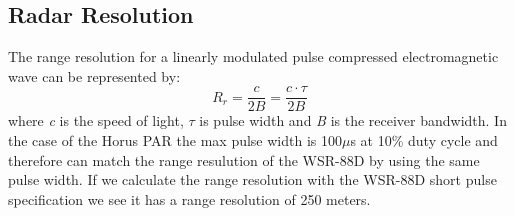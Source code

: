 \documentclass[conference]{IEEEtran}
\begin{document}
\subsection{Radar Resolution}
\par The range resolution for a linearly modulated pulse compressed electromagnetic wave can be represented by:
\begin{equation}
    R_r = \frac{c}{2B} = \frac{c\cdot\tau}{2B}
\end{equation}
where \emph{c} is the speed of light, \emph{$\tau$} is pulse width and \emph{B} is the receiver bandwidth. In the case of the Horus PAR the max pulse width is 100$\mu$s at 10\% duty cycle and therefore can match the range resulution of the WSR-88D by using the same pulse width. If we calculate the range resolution with the WSR-88D short pulse specification we see it has a range resolution of 250 meters.
\end{document}

